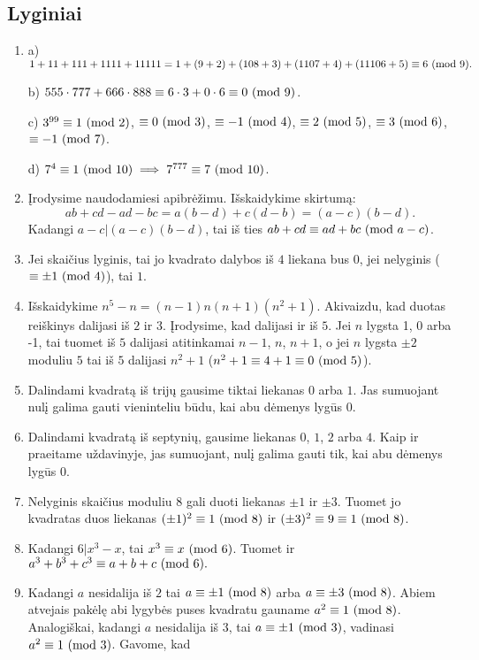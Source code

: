 \subsection*{Lyginiai}
\begin{enumerate} 
\item 
a) $1+11+111+1111+11111 = 1 + (9+2) + (108 + 3) + (1107 + 4) + (11106 +
5) \equiv 6 \ (\text{mod } 9).$

b) $555\cdot 777 + 666\cdot 888 \equiv 6\cdot 3 + 0\cdot 6 \equiv
0\ (\text{mod } 9)$.

c) $3^{99} \equiv 1 \ (\text{mod } 2)$, $\equiv 0 \ (\text{mod } 3)$, $\equiv -1 \ (\text{mod } 4)$,
$\equiv 2 \ (\text{mod } 5)$, $\equiv 3\ (\text{mod } 6)$, $\equiv -1\ (\text{mod } 7)$.

d) $7^4 \equiv 1 \ (\text{mod } 10) \implies 7^{777} \equiv 7 \ (\text{mod } 10)$.
\item 
Įrodysime naudodamiesi apibrėžimu. Išskaidykime skirtumą: $$ab + cd -
ad - bc = a(b-d) + c(d-b) = (a-c)(b-d).$$ Kadangi $a-c|(a-c)(b-d)$,
tai iš ties $ab+cd \equiv ad + bc \ (\text{mod } a-c)$.
\item 
Jei skaičius lyginis, tai jo kvadrato dalybos iš $4$ liekana bus $0$, jei
nelyginis ($\equiv \pm1\ (\text{mod } 4)$), tai $1$.
\item 
Išskaidykime $n^5-n = (n-1)n(n+1)(n^2+1).$ Akivaizdu, kad duotas
reiškinys dalijasi iš $2$ ir $3$. Įrodysime, kad dalijasi ir iš
$5$. Jei $n$ lygsta 1, 0 arba -1, tai tuomet iš $5$ dalijasi
atitinkamai $n-1$, $n$, $n+1$, o jei $n$ lygsta $\pm 2$ moduliu
$5$ tai iš $5$ dalijasi $n^2 +1$ ($n^2 + 1\equiv 4 + 1 \equiv 0 \ (\text{mod } 5)$). 
\item 
Dalindami kvadratą iš trijų gausime tiktai liekanas $0$ arba $1$. Jas
sumuojant nulį galima gauti vieninteliu būdu, kai abu dėmenys lygūs
$0$.
\item 
Dalindami kvadratą iš septynių, gausime liekanas $0$, $1$, $2$ arba
$4$. Kaip ir praeitame uždavinyje, jas sumuojant, nulį galima gauti
tik, kai abu dėmenys lygūs $0$.
\item 
Nelyginis skaičius moduliu $8$ gali duoti liekanas $\pm 1$ ir
$\pm 3$. Tuomet jo kvadratas duos liekanas $(\pm1)^2 \equiv 1 \ (\text{mod } 8)$ ir
$(\pm 3)^2 \equiv 9 \equiv 1 \ (\text{mod } 8)$.
\item 
Kadangi $6|x^3-x$, tai $x^3\equiv x\ (\text{mod } 6)$. Tuomet ir $a^3 + b^3 + c^3
\equiv a+b+c \ (\text{mod } 6).$
\item 
Kadangi $a$ nesidalija iš $2$ tai $a\equiv \pm1 \ (\text{mod } 8)$ arba $a\equiv
\pm3 \ (\text{mod } 8)$. Abiem atvejais pakėlę abi lygybės puses kvadratu gauname
$a^2 \equiv 1\ (\text{mod } 8)$. Analogiškai, kadangi $a$ nesidalija iš $3$, tai
$a\equiv \pm1 \ (\text{mod } 3)$, vadinasi $a^2 \equiv 1 \ (\text{mod } 3)$. Gavome, kad

\end{enumerate}
